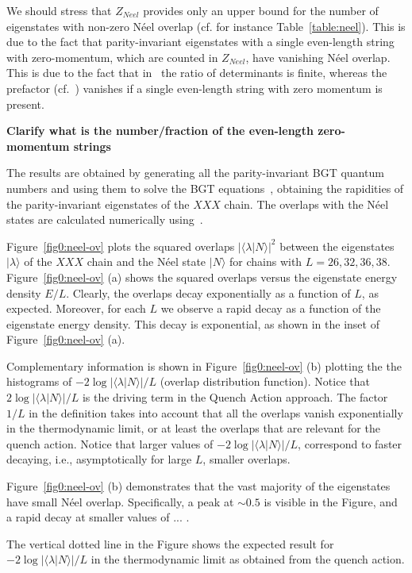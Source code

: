 \documentclass[11pt]{iopart}
\begin{document}
We should stress that $Z_{Neel}$ provides only an upper bound for the number of 
eigenstates with non-zero N\'eel overlap (cf. for instance Table~\ref{table:neel}). 
This is due to the fact that parity-invariant eigenstates with a single even-length 
string with zero-momentum, which are counted in $Z_{Neel}$, have vanishing N\'eel 
overlap. This is due to the fact that in~ the ratio of determinants 
is finite, whereas the prefactor (cf.~) vanishes if a single even-length 
string with zero momentum is present. 

{\bf Clarify what is the number/fraction of the even-length zero-momentum strings}

The results are obtained by generating all the parity-invariant BGT quantum numbers 
and using them to solve the BGT equations~, obtaining the rapidities of 
the parity-invariant eigenstates of the $XXX$ chain. The overlaps with the N\'eel 
states are calculated numerically using~. 

Figure~\ref{fig0:neel-ov} plots the squared overlaps $|\langle\lambda|N\rangle|^2$ 
between the eigenstates $|\lambda\rangle$ of the $XXX$ chain and the N\'eel state 
$|N\rangle$ for chains with $L=26,32,36,38$. Figure~\ref{fig0:neel-ov} (a) shows the 
squared overlaps versus the eigenstate energy density $E/L$. Clearly, the overlaps 
decay exponentially as a function of $L$, as expected. Moreover, for each $L$ 
we observe a rapid decay as a function of the eigenstate energy density. 
This decay is exponential, as shown in the inset of Figure~\ref{fig0:neel-ov} (a). 

Complementary information is shown in Figure~\ref{fig0:neel-ov} (b) plotting the 
the histograms of $-2\log|\langle\lambda|N\rangle|/L$ (overlap distribution 
function). Notice that $2\log|\langle\lambda|N\rangle|/L$ is the driving 
term in the Quench Action approach. The factor $1/L$ in the definition takes 
into account that all the overlaps vanish exponentially in the thermodynamic 
limit, or at least the overlaps that are relevant for the quench action. 
Notice that larger values of $-2\log|\langle\lambda|N\rangle|/L$, correspond 
to faster decaying, i.e., asymptotically for large $L$, smaller overlaps. 

Figure~\ref{fig0:neel-ov} (b) demonstrates that the vast majority of the eigenstates 
have small N\'eel overlap. Specifically, a peak at $\sim 0.5$ is visible in the 
Figure, and a rapid decay at smaller values of ... .

The vertical dotted line in the Figure shows the expected result for 
$-2\log|\langle\lambda|N\rangle|/L$ in the thermodynamic limit as obtained from 
the quench action. 
\end{document}

